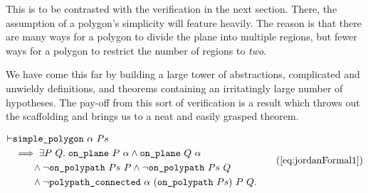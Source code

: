 This is to be contrasted with the verification in the next section. There, the assumption of a polygon's simplicity will feature heavily. The reason is that there are many ways for a polygon to divide the plane into multiple regions, but fewer ways for a polygon to restrict the number of regions to \emph{two}.

We have come this far by building a large tower of abstractions, complicated and unwieldy definitions, and theorems containing an irritatingly large number of hypotheses. The pay-off from this sort of verification is a result which throws out the scaffolding and brings us to a neat and easily grasped theorem.

\begin{equation}
  \begin{split}
    \vdash&\code{simple\_polygon}\ \alpha\ Ps\\
    &\implies \exists P\ Q.\; \code{on\_plane}\ P\ \alpha \wedge \code{on\_plane}\ Q\ \alpha\\
    &\qquad\wedge \neg\code{on\_polypath}\ Ps\ P \wedge \neg\code{on\_polypath}\ Ps\ Q\\
    &\qquad\wedge \neg\code{polypath\_connected}\ \alpha\ (\code{on\_polypath}\ Ps)\ P\ Q.
  \end{split}\tag{\ref{eq:jordanFormal1}}
\end{equation}



